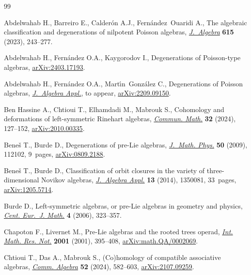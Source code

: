 \documentclass[10pt,a4paper]{amsart}
\numberwithin{equation}{section}
\begin{document}
\begin{thebibliography}{99}
\footnotesize\itemsep=0pt

Abdelwahab H., Barreiro E., Calder\'on A.J., Fern\'andez~Ouaridi A., The
 algebraic classification and degenerations of nilpotent {P}oisson algebras,
 \href{https://doi.org/10.1016/j.jalgebra.2022.10.018}{\textit{J.~Algebra}} \textbf{615} (2023), 243--277.

Abdelwahab H., Fern\'andez O.A., Kaygorodov I., Degenerations of {P}oisson-type
 algebras, \href{https://arxiv.org/abs/2403.17193}{arXiv:2403.17193}.

Abdelwahab H., Fern\'andez O.A., Mart\'{\i}n~Gonz\'alez C., Degenerations of
 {P}oisson algebras, \href{https://doi.org/10.1142/S0219498825500872}{\textit{J.~Algebra Appl.}}, {t}o appear,
 \href{https://arxiv.org/abs/2209.09150}{arXiv:2209.09150}.

Ben Hassine A., Chtioui T., Elhamdadi M., Mabrouk S., Cohomology and
 deformations of left-symmetric {R}inehart algebras, \href{https://doi.org/10.46298/cm.12656}{\textit{Commun. Math.}}
 \textbf{32} (2024), 127--152, \href{https://arxiv.org/abs/2010.00335}{arXiv:2010.00335}.


Bene\v{s} T., Burde D., Degenerations of pre-{L}ie algebras, \href{https://doi.org/10.1063/1.3246608}{\textit{J.~Math.
 Phys.}} \textbf{50} (2009), 112102, 9~pages, \href{https://arxiv.org/abs/0809.2188}{arXiv:0809.2188}.

Bene\v{s} T., Burde D., Classification of orbit closures in the variety of
 three-dimensional {N}ovikov algebras, \href{https://doi.org/10.1142/S0219498813500813}{\textit{J.~Algebra Appl.}} \textbf{13}
 (2014), 1350081, 33~pages, \href{https://arxiv.org/abs/1205.5714}{arXiv:1205.5714}.

Burde D., Left-symmetric algebras, or pre-{L}ie algebras in geometry and
 physics, \href{https://doi.org/10.2478/s11533-006-0014-9}{\textit{Cent. Eur.~J. Math.}} \textbf{4} (2006), 323--357.

Chapoton F., Livernet M., Pre-{L}ie algebras and the rooted trees operad,
 \href{https://doi.org/10.1155/S1073792801000198}{\textit{Int. Math. Res. Not.}} \textbf{2001} (2001), 395--408,
 \href{https://arxiv.org/abs/math.QA/0002069}{arXiv:math.QA/0002069}.

Chtioui T., Das A., Mabrouk S., ({C}o)homology of compatible associative
 algebras, \href{https://doi.org/10.1080/00927872.2023.2245915}{\textit{Comm. Algebra}} \textbf{52} (2024), 582--603,
 \href{https://arxiv.org/abs/2107.09259}{arXiv:2107.09259}.


\end{thebibliography}
\end{document}
